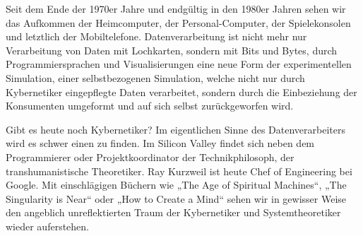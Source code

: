\documentclass[a4paper,11pt]{article}
\begin{document}
Seit dem Ende der 1970er Jahre und endgültig in den 1980er Jahren sehen wir
das Aufkommen der Heimcomputer, der Personal-Computer, der Spielekonsolen und
letztlich der Mobiltelefone. Datenverarbeitung ist nicht mehr nur
Verarbeitung von Daten mit Lochkarten, sondern mit Bits und Bytes, durch
Programmiersprachen und Visualisierungen eine neue Form der experimentellen
Simulation, einer selbstbezogenen Simulation, welche nicht nur durch
Kybernetiker eingepflegte Daten verarbeitet, sondern durch die Einbeziehung
der Konsumenten umgeformt und auf sich selbst zurückgeworfen wird.

Gibt es heute noch Kybernetiker? Im eigentlichen Sinne des Datenverarbeiters
wird es schwer einen zu finden. Im Silicon Valley findet sich neben dem
Programmierer oder Projektkoordinator der Technikphilosoph, der
transhumanistische Theoretiker. Ray Kurzweil ist heute Chef of Engineering bei
Google. Mit einschlägigen Büchern wie „The Age of Spiritual Machines“, „The
Singularity is Near“ oder „How to Create a Mind“ sehen wir in gewisser Weise
den angeblich unreflektierten Traum der Kybernetiker und Systemtheoretiker
wieder auferstehen.
\end{document}
